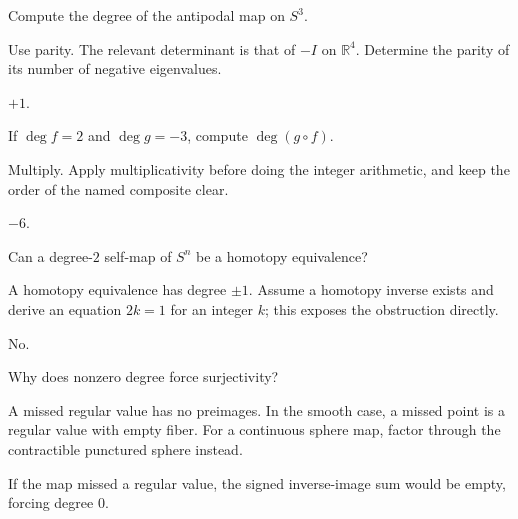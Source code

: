 \begin{exercise}\label{exr:viii03-15}
Compute the degree of the antipodal map on \(S^3\).
\end{exercise}
\begin{hint}Use parity.
The relevant determinant is that of \(-I\) on \(\mathbb R^4\). Determine the parity of its number of negative eigenvalues.
\end{hint}
\begin{solution}
\(+1\).
\end{solution}

\begin{exercise}\label{exr:viii03-16}
If \(\deg f=2\) and \(\deg g=-3\), compute \(\deg(g\circ f)\).
\end{exercise}
\begin{hint}Multiply.
Apply multiplicativity before doing the integer arithmetic, and keep the order of the named composite clear.
\end{hint}
\begin{solution}
\(-6\).
\end{solution}

\begin{exercise}\label{exr:viii03-17}
Can a degree-\(2\) self-map of \(S^n\) be a homotopy equivalence?
\end{exercise}
\begin{hint}A homotopy equivalence has degree \(\pm1\).
Assume a homotopy inverse exists and derive an equation \(2k=1\) for an integer \(k\); this exposes the obstruction directly.
\end{hint}
\begin{solution}
No.
\end{solution}

\begin{exercise}\label{exr:viii03-18}
Why does nonzero degree force surjectivity?
\end{exercise}
\begin{hint}A missed regular value has no preimages.
In the smooth case, a missed point is a regular value with empty fiber. For a continuous sphere map, factor through the contractible punctured sphere instead.
\end{hint}
\begin{solution}
If the map missed a regular value, the signed inverse-image sum would be empty,
forcing degree \(0\).
\end{solution}

